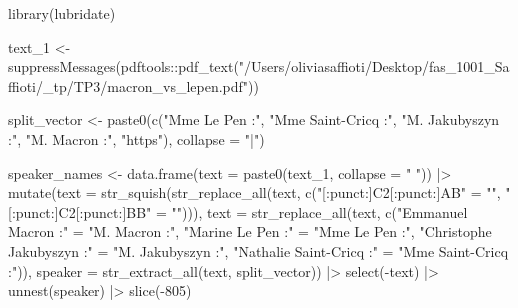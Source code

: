\documentclass[
  letterpaper,
  DIV=11,
  numbers=noendperiod]{scrartcl}
\newenvironment{Shaded}{\begin{snugshade}}{\end{snugshade}}
\newcommand{\AttributeTok}[1]{\textcolor[rgb]{0.40,0.45,0.13}{#1}}
\newcommand{\DecValTok}[1]{\textcolor[rgb]{0.68,0.00,0.00}{#1}}
\newcommand{\FunctionTok}[1]{\textcolor[rgb]{0.28,0.35,0.67}{#1}}
\newcommand{\NormalTok}[1]{\textcolor[rgb]{0.00,0.23,0.31}{#1}}
\newcommand{\OtherTok}[1]{\textcolor[rgb]{0.00,0.23,0.31}{#1}}
\newcommand{\SpecialCharTok}[1]{\textcolor[rgb]{0.37,0.37,0.37}{#1}}
\newcommand{\StringTok}[1]{\textcolor[rgb]{0.13,0.47,0.30}{#1}}
\begin{document}
\begin{Shaded}
\begin{Highlighting}[]
\FunctionTok{library}\NormalTok{(lubridate)}

\NormalTok{text\_1 }\OtherTok{\textless{}{-}}\FunctionTok{suppressMessages}\NormalTok{(pdftools}\SpecialCharTok{::}\FunctionTok{pdf\_text}\NormalTok{(}\StringTok{"/Users/oliviasaffioti/Desktop/fas\_1001\_Saffioti/\_tp/TP3/macron\_vs\_lepen.pdf"}\NormalTok{))}

\NormalTok{split\_vector }\OtherTok{\textless{}{-}} \FunctionTok{paste0}\NormalTok{(}\FunctionTok{c}\NormalTok{(}\StringTok{"Mme Le Pen :"}\NormalTok{, }\StringTok{"Mme Saint{-}Cricq :"}\NormalTok{, }\StringTok{"M. Jakubyszyn :"}\NormalTok{, }\StringTok{"M. Macron :"}\NormalTok{, }\StringTok{"https"}\NormalTok{), }\AttributeTok{collapse =} \StringTok{"|"}\NormalTok{)}

\NormalTok{speaker\_names }\OtherTok{\textless{}{-}} \FunctionTok{data.frame}\NormalTok{(}\AttributeTok{text =} \FunctionTok{paste0}\NormalTok{(text\_1, }\AttributeTok{collapse =} \StringTok{" "}\NormalTok{)) }\SpecialCharTok{|\textgreater{}}
  \FunctionTok{mutate}\NormalTok{(}\AttributeTok{text =} \FunctionTok{str\_squish}\NormalTok{(}\FunctionTok{str\_replace\_all}\NormalTok{(text, }\FunctionTok{c}\NormalTok{(}\StringTok{"[:punct:]C2[:punct:]AB"}  \OtherTok{=} \StringTok{""}\NormalTok{,}
                                                   \StringTok{"[:punct:]C2[:punct:]BB"}  \OtherTok{=} \StringTok{""}\NormalTok{))),}
         \AttributeTok{text =} \FunctionTok{str\_replace\_all}\NormalTok{(text, }\FunctionTok{c}\NormalTok{(}\StringTok{"Emmanuel Macron :"}       \OtherTok{=} \StringTok{"M. Macron :"}\NormalTok{,}
                                        \StringTok{"Marine Le Pen :"}         \OtherTok{=} \StringTok{"Mme Le Pen :"}\NormalTok{,}
                                        \StringTok{"Christophe Jakubyszyn :"} \OtherTok{=} \StringTok{"M. Jakubyszyn :"}\NormalTok{,}
                                        \StringTok{"Nathalie Saint{-}Cricq :"}  \OtherTok{=} \StringTok{"Mme Saint{-}Cricq :"}\NormalTok{)),}
         \AttributeTok{speaker =} \FunctionTok{str\_extract\_all}\NormalTok{(text, split\_vector)) }\SpecialCharTok{|\textgreater{}} 
  \FunctionTok{select}\NormalTok{(}\SpecialCharTok{{-}}\NormalTok{text) }\SpecialCharTok{|\textgreater{}} 
  \FunctionTok{unnest}\NormalTok{(speaker) }\SpecialCharTok{|\textgreater{}} 
  \FunctionTok{slice}\NormalTok{(}\SpecialCharTok{{-}}\DecValTok{805}\NormalTok{)}


\end{Highlighting}
\end{Shaded}
\end{document}
